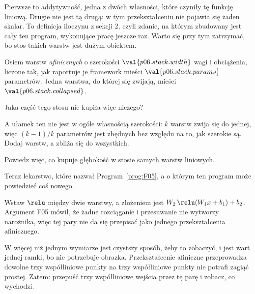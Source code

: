\begin{fr}
Pierwsze to addytywność, jedna z dwóch własności, które czyniły tę funkcję
liniową. Drugie nie jest tą drugą: w tym przekształceniu nie pojawia się żaden
skalar. To definicja iloczynu z sekcji 2, czyli zdanie, na którym zbudowany
jest cały ten program, wykonujące pracę jeszcze raz.
Warto się przy tym zatrzymać, bo stos takich warstw jest dużym obiektem.

Osiem warstw \emph{afinicznych} o szerokości $\val{p06.stack.width}$ \dash{}
wagi i obciążenia, liczone tak, jak raportuje je framework \dash{} mieści
$\val{p06.stack.params}$ parametrów. Jedna warstwa, do której się zwijają,
mieści $\val{p06.stack.collapsed}$.

Jaka część tego stosu nie kupiła więc niczego?
\nextframe
\end{fr}

\begin{fr}
A ułamek ten nie jest w ogóle własnością szerokości: $k$ warstw zwija się do
jednej, więc $(k-1)/k$ parametrów jest zbędnych bez względu na to, jak szerokie
są. Dodaj warstw, a zbliża się do wszystkich.

Powiedz więc, co kupuje głębokość w stosie samych warstw liniowych.
\dotline
\nextframe
\end{fr}

\begin{fr}
Teraz lekarstwo, które nazwał Program~\ref{prog:F05}, a o którym ten program
może powiedzieć coś nowego.

Wstaw $\relu$ między dwie warstwy, a złożeniem jest
$W_2\,\relu(W_1x + b_1) + b_2$. Argument F05 mówił, że żadne rozciąganie i
przesuwanie nie wytworzy narożnika, więc tej pary nie da się przepisać jako
jednego przekształcenia afinicznego.

W więcej niż jednym wymiarze jest czystszy sposób, żeby to zobaczyć, i jest
wart jednej ramki, bo nie potrzebuje obrazka. Przekształcenie afiniczne
przeprowadza dowolne trzy współliniowe punkty na trzy współliniowe punkty
\dash{} nie potrafi zagiąć prostej. Zatem: przepuść trzy współliniowe wejścia
przez tę parę i zobacz, co wychodzi.
\nextframe
\end{fr}

